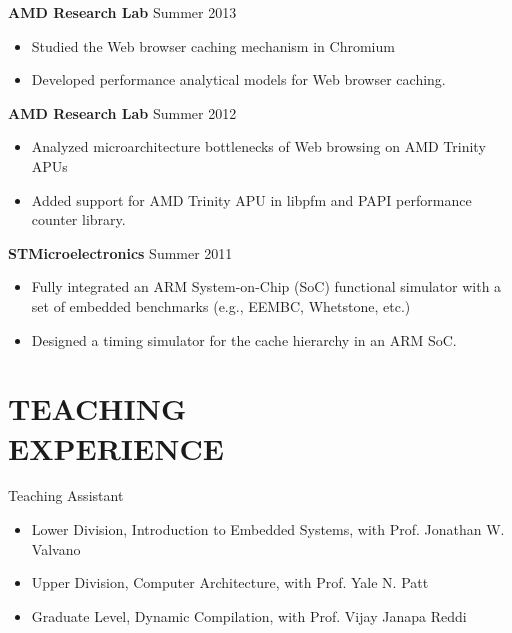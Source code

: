 \documentclass[margin, 9pt]{res} %
\begin{document}
\begin{resume}
\medskip
{\textbf{AMD Research Lab}} \hfill{Summer 2013}\\
\vspace*{-10pt}
\begin{itemize}[leftmargin=*] \itemsep -3pt
\vspace*{-5pt}
	\item Studied the Web browser caching mechanism in Chromium
	\item Developed performance analytical models for Web browser caching.
\end{itemize}

\medskip
{\textbf{AMD Research Lab}} \hfill{Summer 2012}\\
\vspace*{-10pt}
\begin{itemize}[leftmargin=*] \itemsep -3pt
\vspace*{-5pt}
	\item Analyzed microarchitecture bottlenecks of Web browsing on AMD Trinity APUs
	\item Added support for AMD Trinity APU in libpfm and PAPI performance counter library.
\end{itemize}

\medskip
{\textbf{STMicroelectronics}} \hfill{Summer 2011}\\
\vspace*{-10pt}
\begin{itemize}[leftmargin=*] \itemsep -3pt
\vspace*{-5pt}
	\item Fully integrated an ARM System-on-Chip (SoC) functional simulator with a set of embedded benchmarks (e.g., EEMBC, Whetstone, etc.)
	\item Designed a timing simulator for the cache hierarchy in an ARM SoC.
\end{itemize}


\section{TEACHING\\ EXPERIENCE} 

{\large{Teaching Assistant}}\\
\vspace*{-5pt}
\begin{itemize}[leftmargin=*] \itemsep -2pt
\vspace*{-5pt}
	\item Lower Division, Introduction to Embedded Systems, with Prof. Jonathan W. Valvano
	\item Upper Division, Computer Architecture, with Prof. Yale N. Patt
	\item Graduate Level, Dynamic Compilation, with Prof. Vijay Janapa Reddi
\end{itemize}


\end{resume}
\end{document}
